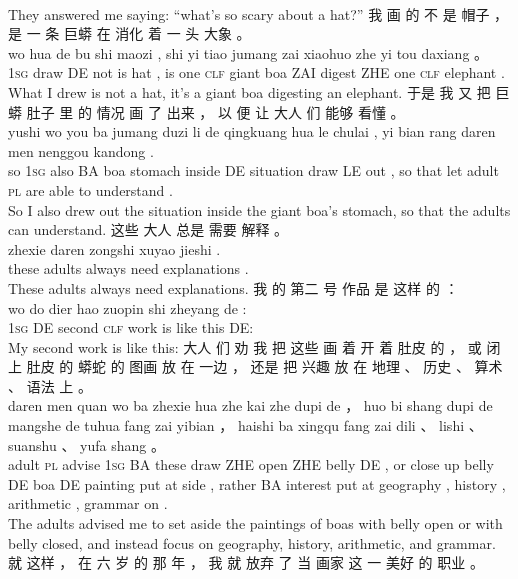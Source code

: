 \documentclass[UTF8]{ctexart}
\begin{document}
\begin{exe}
\\
\trans They answered me saying: ``what's so scary about a hat?''
\ex
\glll
我 画 的 不 是 帽子 ， 是 一 条 巨蟒 在 消化 着 一 头 大象 。
\\
wo hua de bu shi maozi , shi yi tiao jumang zai xiaohuo zhe yi tou daxiang 。
\\
\textsc{1sg} draw DE not is hat , is one \textsc{clf} {giant boa} ZAI digest ZHE one \textsc{clf} elephant . 
\\
\trans What I drew is not a hat, it's a giant boa digesting an elephant. 
\ex
\glll
于是 我 又 把 巨蟒 肚子 里 的 情况 画 了 出来 ， 以 便 让 大人 们 能够 看懂 。
\\
yushi wo you ba jumang duzi li de qingkuang hua le chulai , yi bian rang daren men nenggou kandong . 
\\
so \textsc{1sg} also BA boa stomach inside DE situation draw LE out , {} {so that} let adult \textsc{pl} {are able to} {understand} . 
\\
\trans So I also drew out the situation inside the giant boa's stomach, so that the adults can understand. 
\ex
\glll
这些 大人 总是 需要 解释 。
\\
zhexie daren zongshi xuyao jieshi . 
\\
these adults always need explanations .
\\
\trans These adults always need explanations.
\ex
\glll
我 的 第二 号 作品 是 这样 的 ：
\\
wo do dier hao zuopin shi zheyang de :
\\
\textsc{1sg} DE second \textsc{clf} work is {like this} DE:
\\
\trans My second work is like this:
\ex
\glll
大人 们 劝 我 把 这些 画 着 开 着 肚皮 的 ， 或 闭 上 肚皮 的 蟒蛇 的 图画 放 在 一边 ， 还是 把 兴趣 放 在 地理 、 历史 、 算术 、 语法 上 。
\\
daren men quan wo ba zhexie hua zhe kai zhe dupi de ， huo bi shang dupi de mangshe de tuhua fang zai yibian ， haishi ba xingqu fang zai dili 、 lishi 、 suanshu 、 yufa shang 。
\\
adult \textsc{pl} advise \textsc{1sg} BA these draw ZHE open ZHE belly DE , or close up belly DE boa DE painting put at side , rather BA interest put at geography , history , arithmetic , grammar on .
\\
\trans The adults advised me to set aside the paintings of boas with belly open or with belly closed, and instead focus on geography, history, arithmetic, and grammar. 
\ex
\glll
就 这样 ， 在 六 岁 的 那 年 ， 我 就 放弃 了 当 画家 这 一 美好 的 职业 。

\end{exe}
\end{document}
